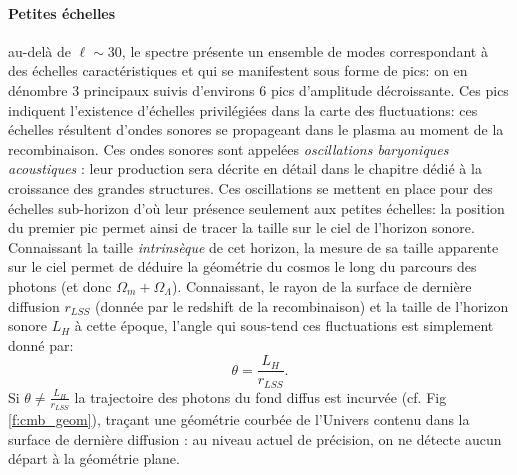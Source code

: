 \paragraph{Petites échelles} au-delà de $\ell\sim 30$, le spectre présente un ensemble de modes correspondant à des échelles caractéristiques et qui se manifestent sous forme de pics: on en dénombre 3 principaux suivis d'environs 6 pics d'amplitude décroissante. Ces pics indiquent l'existence d'échelles privilégiées dans la carte des fluctuations: ces échelles résultent d'ondes sonores se propageant dans le plasma au moment de la recombinaison. Ces ondes sonores sont appelées \textit{oscillations baryoniques acoustiques}  : leur production sera décrite en détail dans le chapitre dédié à la croissance des grandes structures. Ces oscillations se mettent en place pour des échelles sub-horizon d'où leur présence seulement aux petites échelles: la position du premier pic permet ainsi de tracer la taille sur le ciel de l'horizon sonore. Connaissant la taille \textit{intrinsèque} de cet horizon, la mesure de sa taille apparente sur le ciel permet de déduire la géométrie du cosmos le long du parcours des photons (et donc $\Omega_m+\Omega_\Lambda$). Connaissant, le rayon de la surface de dernière diffusion $r_{LSS}$ (donnée par le redshift de la recombinaison) et la taille de l'horizon  sonore $L_H$ à cette époque, l'angle qui sous-tend ces fluctuations est simplement donné par:
\begin{equation}
\theta=\frac{L_H}{r_{LSS}}.
\end{equation}
Si $\theta \neq \frac{L_H}{r_{LSS}}$ la trajectoire des photons du fond diffus est incurvée (cf. Fig \ref{f:cmb_geom}), traçant une géométrie courbée de l'Univers contenu dans la surface de dernière diffusion : au niveau actuel de précision, on ne détecte aucun départ à la géométrie plane.
